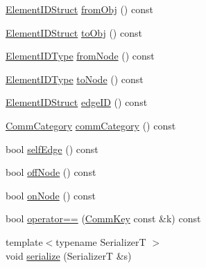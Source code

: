 \begin{DoxyCompactItemize}
\item 
\hyperlink{structvt_1_1elm_1_1_element_i_d_struct}{Element\+I\+D\+Struct} \hyperlink{structvt_1_1elm_1_1_comm_key_a75f1afcaf2349cdc7de7bf8586ba8832}{from\+Obj} () const
\item 
\hyperlink{structvt_1_1elm_1_1_element_i_d_struct}{Element\+I\+D\+Struct} \hyperlink{structvt_1_1elm_1_1_comm_key_a4dd567c04eea5bb8aeb2acd7ad8f01de}{to\+Obj} () const
\item 
\hyperlink{namespacevt_1_1elm_a63afb64985b41b7b6dcf2f01336391f8}{Element\+I\+D\+Type} \hyperlink{structvt_1_1elm_1_1_comm_key_a0ca4110f2eec16b09cbb1201c3e094e6}{from\+Node} () const
\item 
\hyperlink{namespacevt_1_1elm_a63afb64985b41b7b6dcf2f01336391f8}{Element\+I\+D\+Type} \hyperlink{structvt_1_1elm_1_1_comm_key_a049276643e77cfea00a68e5dcaa87eb2}{to\+Node} () const
\item 
\hyperlink{structvt_1_1elm_1_1_element_i_d_struct}{Element\+I\+D\+Struct} \hyperlink{structvt_1_1elm_1_1_comm_key_a23b4e6a59e39eac8a5e631496e6cd618}{edge\+ID} () const
\item 
\hyperlink{namespacevt_1_1elm_ab7367fdbe88bdcf329563642147f9ae2}{Comm\+Category} \hyperlink{structvt_1_1elm_1_1_comm_key_af456efc0f7900eeca45b130b59de4aed}{comm\+Category} () const
\item 
bool \hyperlink{structvt_1_1elm_1_1_comm_key_afbe1b9e740b507000addc28a4f5245df}{self\+Edge} () const
\item 
bool \hyperlink{structvt_1_1elm_1_1_comm_key_a52b50e35388e05418d9288ee3233659e}{off\+Node} () const
\item 
bool \hyperlink{structvt_1_1elm_1_1_comm_key_a3f8677b9b9107edd7b6dd3412a89143e}{on\+Node} () const
\item 
bool \hyperlink{structvt_1_1elm_1_1_comm_key_afe0d2056b16820eb721fd282eeb53f73}{operator==} (\hyperlink{structvt_1_1elm_1_1_comm_key}{Comm\+Key} const \&k) const
\item 
{\footnotesize template$<$typename SerializerT $>$ }\\void \hyperlink{structvt_1_1elm_1_1_comm_key_a7fe80a1dba0e87be03df137c7cb246ac}{serialize} (SerializerT \&s)
\end{DoxyCompactItemize}
